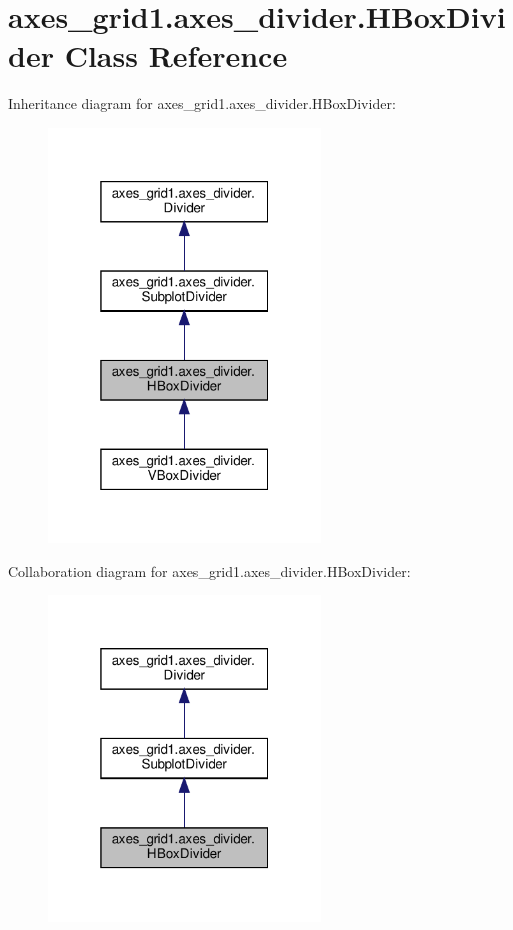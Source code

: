 \hypertarget{classaxes__grid1_1_1axes__divider_1_1HBoxDivider}{}\section{axes\+\_\+grid1.\+axes\+\_\+divider.\+H\+Box\+Divider Class Reference}
\label{classaxes__grid1_1_1axes__divider_1_1HBoxDivider}


Inheritance diagram for axes\+\_\+grid1.\+axes\+\_\+divider.\+H\+Box\+Divider\+:
\nopagebreak
\begin{figure}[H]
\begin{center}
\leavevmode
\includegraphics[width=205pt]{classaxes__grid1_1_1axes__divider_1_1HBoxDivider__inherit__graph}
\end{center}
\end{figure}


Collaboration diagram for axes\+\_\+grid1.\+axes\+\_\+divider.\+H\+Box\+Divider\+:
\nopagebreak
\begin{figure}[H]
\begin{center}
\leavevmode
\includegraphics[width=205pt]{classaxes__grid1_1_1axes__divider_1_1HBoxDivider__coll__graph}
\end{center}
\end{figure}
